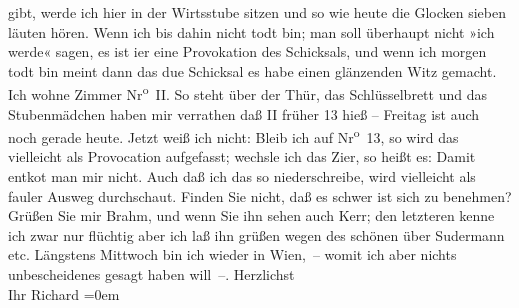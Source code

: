 \begin{ledgroupsized}[t]{13cm}
               gibt, werde ich hier in der Wirtsstube sitzen und so wie heute die Glocken sieben {\pb}läuten hören. Wenn ich bis dahin
               nicht todt bin; man soll überhaupt nicht »ich werde« sagen, es ist i{\geminationm}er eine Provokation des Schicksals, und wenn ich morgen
               todt bin meint dann das du{\geminationm}e Schicksal es habe einen
               glänzenden Witz gemacht.\pend
           \pstart
           {\pb}Ich wohne Zimmer Nr\textsuperscript{o} II. So steht über der Thür, das Schlüsselbrett und das
               Stubenmädchen haben mir verrathen daß II früher 13 hieß – Freitag ist auch noch
               gerade heute. Jetzt weiß ich nicht: Bleib ich auf Nr\textsuperscript{o} 13,
               so wird das vielleicht als Provocation aufgefasst; {\pb}wechsle ich das Zi{\geminationm}er, so heißt es: Damit entko{\geminationm}t man mir nicht. Auch daß ich das so niederschreibe,
               wird vielleicht als fauler Ausweg durchschaut. Finden Sie nicht, daß es schwer ist
               sich zu benehmen? Grüßen Sie mir Brahm, und
               wenn Sie ihn {\pb}sehen auch Kerr; den letzteren kenne ich zwar nur flüchtig
               aber ich laß ihn grüßen wegen des schönen \label{K_L00913-3v}\label{K_L00913-3h} über Sudermann etc.\pend
           \pstart
           Längstens Mittwoch bin ich wieder in Wien, – womit ich aber nichts unbescheidenes gesagt haben will –.\pend
           \pstart
           Herzlichst {\\[\baselineskip]}Ihr \spacefill\mbox{Richard}\pend
           \leftskip=0em{}
         
         \endnumbering{}\end{ledgroupsized}  \newcommand{\dateiname}{L00913}\newcommand{\titel}{Richard Beer-Hofmann an Arthur Schnitzler, 28. 4. 1899}\newcommand{\editorInnen}{Martin Anton Müller und Gerd-Hermann Susen}
      